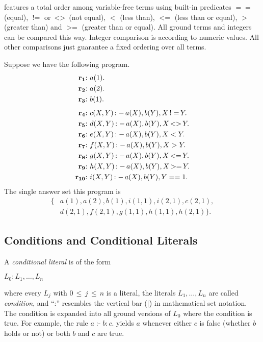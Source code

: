 \documentclass[a4paper, titlepage]{article}
\DeclareMathOperator{\leftimpl}{:-}
\DeclareMathOperator{\noteq}{!=}
\DeclareMathOperator{\noteqq}{<>}
\DeclareMathOperator{\lesseq}{<=}
\DeclareMathOperator{\geeq}{>=}
\newcommand{\les}{\,{\le}\,}
\newcommand\mycenterline[1]{\par\smallskip\centerline{#1} \smallskip}
\newcommand{\rowprefix}[1]{%
  \ensuremath{\color{black}\mathbf{#1{:}}\ }%
}
\begin{document}
\dlvhex{} features a total order among variable-free terms 
using built-in predicates $==$ (equal), $\noteq$ or $\noteqq$ (not equal), 
$<$ (less than), $\lesseq$ (less than or equal), $>$ (greater 
than) and $\geeq$ (greater than or equal).
All ground terms and integers can be compared this way.
Integer comparison is according to numeric values. All other 
comparisons just guarantee a fixed ordering 
over all terms.
\begin{exmp}
Suppose we have the following program.
\begin{align*}
\rowprefix{r_1}& a(1). \\
\rowprefix{r_2}& a(2). \\
\rowprefix{r_3}& b(1). \\[1ex]
\rowprefix{r_4}& c(X,Y) \leftimpl a(X), b(Y), X \noteq Y. \\
\rowprefix{r_5}& d(X,Y) \leftimpl a(X), b(Y), X \noteqq Y. \\
\rowprefix{r_6}& e(X,Y) \leftimpl a(X), b(Y), X < Y. \\
\rowprefix{r_7}& f(X,Y) \leftimpl a(X), b(Y), X > Y. \\
\rowprefix{r_8}& g(X,Y) \leftimpl a(X), b(Y), X \lesseq Y. \\
\rowprefix{r_9}& h(X,Y) \leftimpl a(X), b(Y), X \geeq Y. \\
\rowprefix{r_{10}}& i(X,Y) \leftimpl a(X), b(Y), Y == 1. 
\end{align*}
The single answer set this program is
\begin{align*}
\{ & a(1),a(2),b(1),i(1,1),i(2,1),c(2,1),\\
   & d(2,1),f(2,1),g(1,1),h(1,1),h(2,1)\}.
\end{align*}
\end{exmp}

\subsection{Conditions and Conditional Literals}
\label{conditions}
A \emph{conditional literal} is of the form 
\mycenterline{$L_0:L_1,\dots,L_n$}%
where every $\mathit{L_j}$ 
with $0 \les j \les n$ is a literal,
the literals $L_1,\dots,L_n$ are called \emph{condition},
and \enquote{:} resembles the vertical bar ($\mid$)
in mathematical set notation.
The condition is expanded into all ground versions of $L_0$
where the condition is true.
%
For example, the rule $\mathit{a \leftimpl b : c.}$ yields 
$a$ whenever either $c$ is false (whether $b$ holds or not) 
or both $b$ and $c$ are true.
\end{document}

